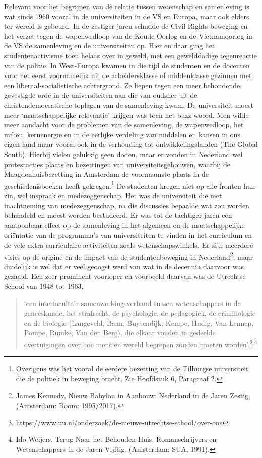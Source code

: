 \documentclass{jote-book}
\begin{document}
	Relevant voor het begrijpen van de relatie tussen wetenschap en samenleving is wat sinds 1960 vooral in de universiteiten in de VS en Europa, maar ook elders ter wereld is gebeurd. In de zestiger jaren schudde de Civil Rights beweging en het verzet tegen de wapenwedloop van de Koude Oorlog en de Vietnamoorlog in de VS de samenleving en de universiteiten op. Hier en daar ging het studentenactivisme toen helaas over in geweld, met een gewelddadige tegenreactie van de politie. In West-Europa kwamen in die tijd de studenten en de docenten voor het eerst voornamelijk uit de arbeidersklasse of middenklasse gezinnen met een liberaal-socialistische achtergrond. Ze liepen tegen een meer behoudende gevestigde orde in de universiteiten aan die van oudsher uit de christendemocratische toplagen van de samenleving kwam. De universiteit moest meer ‘maatschappelijke relevantie' krijgen was toen het buzz-woord. Men wilde meer aandacht voor de problemen van de samenleving, de wapenwedloop, het milieu, kernenergie en in de eerlijke verdeling van middelen en kansen in ons eigen land maar vooral ook in de verhouding tot ontwikkelingslanden (The Global South). Hierbij vielen gelukkig geen doden, maar er vonden in Nederland wel protestacties plaats en bezettingen van universiteitsgebouwen, waarbij de Maagdenhuisbezetting in Amsterdam de voornaamste plaats in de geschiedenisboeken heeft gekregen.\footnote{Overigens was het vooral de eerdere bezetting van de Tilburgse universiteit die de politiek in beweging bracht. Zie Hoofdstuk 6, Paragraaf 2.} De studenten kregen niet op alle fronten hun zin, wel inspraak en medezeggenschap. Het was de universiteit die met inachtneming van medezeggenschap, na die discussies bepaalde wat zou worden behandeld en moest worden bestudeerd. Er was tot de tachtiger jaren een aantoonbaar effect op de samenleving in het algemeen en de maatschappelijke oriëntatie van de programma's van universiteiten te vinden in het curriculum en de vele extra curriculaire activiteiten zoals wetenschapswinkels. Er zijn meerdere visies op de origine en de impact van de studentenbeweging in Nederland\footnote{James Kennedy, Nieuw Babylon in Aanbouw: Nederland in de Jaren Zestig, (Amsterdam: Boom: 1995/2017).}, maar duidelijk is wel dat er veel geoogst werd van wat in de decennia daarvoor was gezaaid. Een zeer prominent voorloper en voorbeeld daarvan was de Utrechtse School van 1948 tot 1963,

	\begin{quote}
		\itshape

		‘een interfacultair samenwerkingsverband tussen wetenschappers in de geneeskunde, het strafrecht, de psychologie, de pedagogiek, de criminologie en de biologie (Langeveld, Baan, Buytendijk, Kempe, Hudig, Van Lennep, Pompe, Rümke, Van den Berg), die elkaar vonden in gedeelde overtuigingen over hoe mens en wereld begrepen zouden moeten worden'.\footnote{https://www.uu.nl/onderzoek/de-nieuwe-utrechtse-school/over-ons}\textsuperscript{,}\footnote{Ido Weijers, Terug Naar het Behouden Huis; Romanschrijvers en Wetenschappers in de Jaren Vijftig. (Amsterdam: SUA, 1991). }
	\end{quote}
\end{document}
